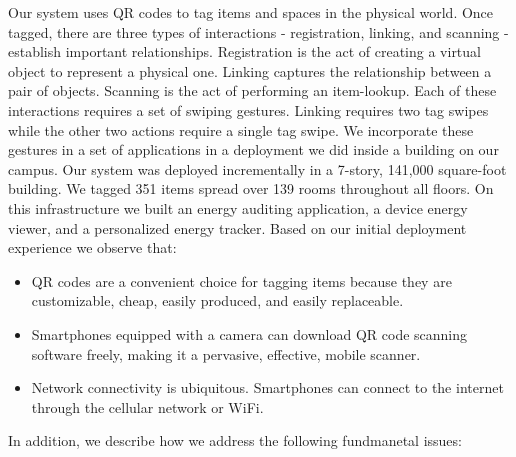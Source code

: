 Our system uses QR codes to tag items and spaces in the physical world.  Once tagged, there are three types of interactions - registration, linking, and scanning -  establish important relationships.  Registration is the act of creating a virtual object to represent a physical one.  Linking
captures the relationship between a pair of objects.  Scanning is the act of performing an item-lookup.
Each of these interactions requires a set of swiping gestures.  Linking requires two tag swipes while the other two actions
require a single tag swipe.  We incorporate these gestures in a set of applications in a deployment we did inside
a building on our campus.  Our system was deployed incrementally in a 7-story, 141,000 square-foot building.  
We tagged 351 items spread over 139 rooms throughout all floors.  On this infrastructure we built an energy auditing application,
a device energy viewer, and a personalized energy tracker.  Based on our initial deployment experience
we observe that:

\begin{itemize}
\item QR codes are a convenient choice for tagging items because they are customizable, cheap, easily produced, and easily replaceable.
\item Smartphones equipped with a camera can download QR code scanning software freely, making it a pervasive, effective, mobile scanner.
\item Network connectivity is ubiquitous.  Smartphones can connect to the internet through the cellular network or WiFi.
\end{itemize}

\vspace{0.08in}

In addition, we describe how we address the following fundmanetal issues:

